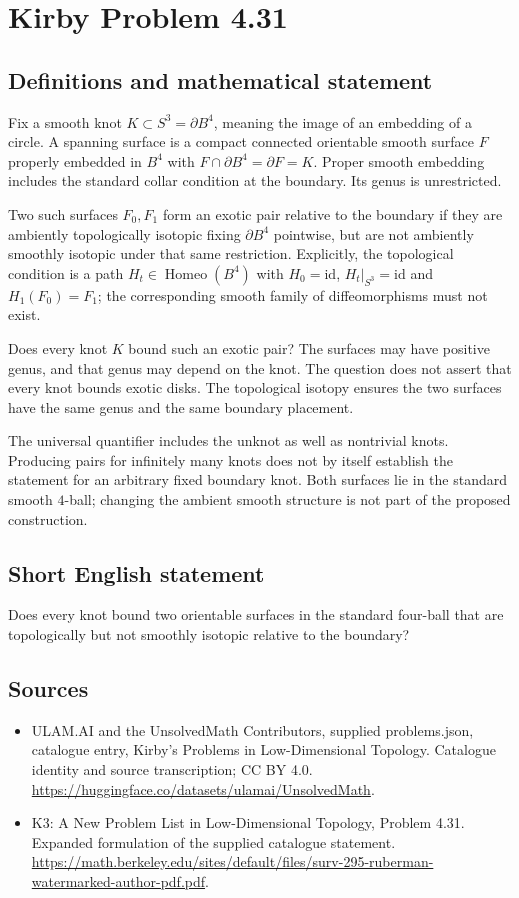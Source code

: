 \documentclass[11pt,a4paper]{article}
\begin{document}
\section*{Kirby Problem 4.31}\label{statement}

\subsection{Definitions and mathematical statement}
Fix a smooth knot $K\subset S^3=\partial B^4$, meaning the image of
an embedding of a circle. A spanning surface is a compact connected
orientable smooth surface $F$ properly embedded in $B^4$ with
$F\cap\partial B^4=\partial F=K$. Proper smooth embedding includes
the standard collar condition at the boundary. Its genus is unrestricted.

Two such surfaces $F_0,F_1$ form an exotic pair relative to the
boundary if they are ambiently topologically isotopic fixing
$\partial B^4$ pointwise, but are not ambiently smoothly isotopic
under that same restriction. Explicitly, the topological condition is
a path $H_t\in\operatorname{Homeo}(B^4)$ with $H_0=\mathrm{id}$,
$H_t|_{S^3}=\mathrm{id}$ and $H_1(F_0)=F_1$; the corresponding
smooth family of diffeomorphisms must not exist.

Does every knot $K$ bound such an exotic pair? The surfaces may
have positive genus, and that genus may depend on the knot. The
question does not assert that every knot bounds exotic disks.
The topological isotopy ensures the two surfaces have the same genus
and the same boundary placement.

The universal quantifier includes the unknot as well as nontrivial
knots. Producing pairs for infinitely many knots does not by itself
establish the statement for an arbitrary fixed boundary knot. Both
surfaces lie in the standard smooth $4$-ball; changing the ambient
smooth structure is not part of the proposed construction.
\subsection{Short English statement}
Does every knot bound two orientable surfaces in the standard four-ball that are topologically but not smoothly isotopic relative to the boundary?
\subsection{Sources}
\begin{itemize}
\item[S1] ULAM.AI and the UnsolvedMath Contributors, supplied problems.json, catalogue entry, Kirby's Problems in Low-Dimensional Topology. Catalogue identity and source transcription; CC BY 4.0.
\url{https://huggingface.co/datasets/ulamai/UnsolvedMath}.
\item[S2] K3: A New Problem List in Low-Dimensional Topology, Problem 4.31. Expanded formulation of the supplied catalogue statement.
\url{https://math.berkeley.edu/sites/default/files/surv-295-ruberman-watermarked-author-pdf.pdf}.
\end{itemize}
\end{document}
